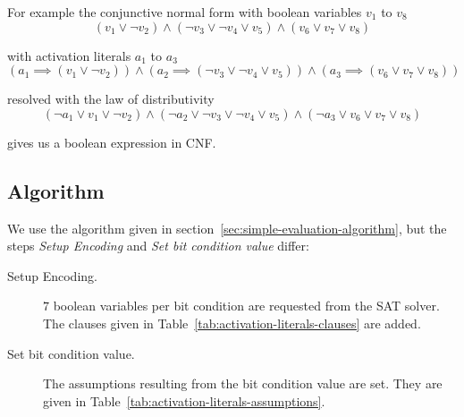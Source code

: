 For example the conjunctive normal form with boolean variables $v_1$ to $v_8$
%
\[
  (v_1 \lor \neg v_2) \land (\neg v_3 \lor \neg v_4 \lor v_5) \land
    (v_6 \lor v_7 \lor v_8)
\]

with activation literals $a_1$ to $a_3$
\[
  (a_1 \implies (v_1 \lor \neg v_2)) \land
    (a_2 \implies (\neg v_3 \lor \neg v_4 \lor v_5)) \land
    (a_3 \implies (v_6 \lor v_7 \lor v_8))
\]

resolved with the law of distributivity
\[
  (\neg a_1 \lor v_1 \lor \neg v_2) \land
    (\neg a_2 \lor \neg v_3 \lor \neg v_4 \lor v_5) \land
    (\neg a_3 \lor v_6 \lor v_7 \lor v_8)
\]

gives us a boolean expression in CNF.

\newpage
\subsection{Algorithm}
\label{sec:activation-literals-algorithm}
%
We use the algorithm given in section~\ref{sec:simple-evaluation-algorithm}, but the steps \emph{Setup Encoding} and \emph{Set bit condition value} differ:
\begin{description}
      \item[Setup Encoding.] $7$ boolean variables per bit condition are requested from the SAT solver. The clauses given in Table~\ref{tab:activation-literals-clauses} are added.
      \item[Set bit condition value.] The assumptions resulting from the bit condition value are set. They are given in Table~\ref{tab:activation-literals-assumptions}.
\end{description}

